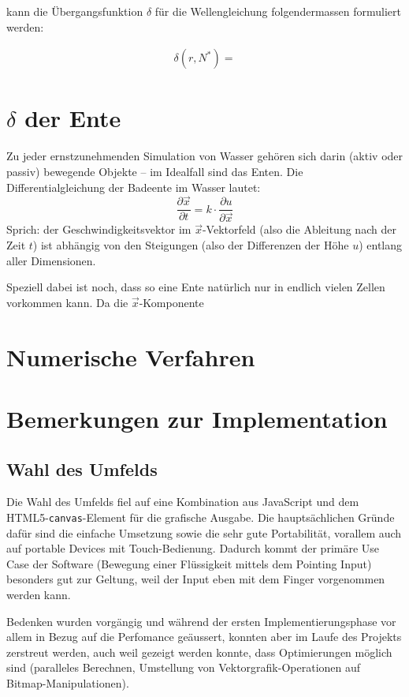 \documentclass[11pt]{article} %
\theoremstyle{definition}
\begin{document}
kann die Übergangsfunktion $\delta$ für die Wellengleichung folgendermassen formuliert werden:

\begin{eqnarray*}
\delta(r, N^*) = 
\end{eqnarray*}

\section{$\delta$ der Ente}

Zu jeder ernstzunehmenden Simulation von Wasser gehören sich darin (aktiv oder passiv) bewegende Objekte -- im Idealfall sind das Enten. Die Differentialgleichung der Badeente im Wasser lautet:
\[
\frac{\partial \vec{x}}{\partial t} = k\cdot \frac{\partial u}{\partial \vec{x}}
\]
Sprich: der Geschwindigkeitsvektor im $\vec{x}$-Vektorfeld (also die Ableitung nach der Zeit $t$) ist abhängig von den Steigungen (also der Differenzen der Höhe $u$) entlang aller Dimensionen.

Speziell dabei ist noch, dass so eine Ente natürlich nur in endlich vielen Zellen vorkommen kann. Da die $\vec{x}$-Komponente 

\section{Numerische Verfahren}

\section{Bemerkungen zur Implementation}

\subsection{Wahl des Umfelds}

Die Wahl des Umfelds fiel auf eine Kombination aus JavaScript und dem HTML5-{\tt canvas}-Element für die grafische Ausgabe. Die hauptsächlichen Gründe dafür sind die einfache Umsetzung sowie die sehr gute Portabilität, vorallem auch auf portable Devices mit Touch-Bedienung. Dadurch kommt der primäre Use Case der Software (Bewegung einer Flüssigkeit mittels dem Pointing Input) besonders gut zur Geltung, weil der Input eben mit dem Finger vorgenommen werden kann.

Bedenken wurden vorgängig und während der ersten Implementierungsphase vor allem in Bezug auf die Perfomance geäussert, konnten aber im Laufe des Projekts zerstreut werden, auch weil gezeigt werden konnte, dass Optimierungen möglich sind (paralleles Berechnen, Umstellung von Vektorgrafik-Operationen auf Bitmap-Manipulationen).
\end{document}
